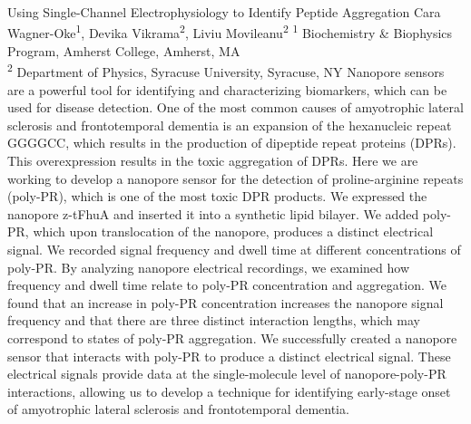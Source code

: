 \makeabstract
    {
    Using Single-Channel Electrophysiology to Identify Peptide Aggregation
    }
    {
    Cara Wagner-Oke\textsuperscript{1}, Devika Vikrama\textsuperscript{2}, Liviu Movileanu\textsuperscript{2}
    }
    {
    \textsuperscript{1} Biochemistry \& Biophysics Program, Amherst College, Amherst, MA\\
\textsuperscript{2} Department of Physics, Syracuse University, Syracuse, NY
    }
    {
    Nanopore sensors are a powerful tool for identifying and characterizing biomarkers, which can be used for disease detection. One of the most common causes of amyotrophic lateral sclerosis and frontotemporal dementia is an expansion of the hexanucleic repeat GGGGCC, which results in the production of dipeptide repeat proteins (DPRs). This overexpression results in the toxic aggregation of DPRs. Here we are working to develop a nanopore sensor for the detection of proline-arginine repeats (poly-PR), which is one of the most toxic DPR products.
    }
    {
    We expressed the nanopore z-tFhuA and inserted it into a synthetic lipid bilayer. We added poly-PR, which upon translocation of the nanopore, produces a distinct electrical signal. We recorded signal frequency and dwell time at different concentrations of poly-PR. By analyzing nanopore electrical recordings, we examined how frequency and dwell time relate to poly-PR concentration and aggregation. 
    }
    {
    We found that an increase in poly-PR concentration increases the nanopore signal frequency and that there are three distinct interaction lengths, which may correspond to states of poly-PR aggregation.
    }
    {
    We successfully created a nanopore sensor that interacts with poly-PR to produce a distinct electrical signal. These electrical signals provide data at the single-molecule level of nanopore-poly-PR interactions, allowing us to develop a technique for identifying early-stage onset of amyotrophic lateral sclerosis and frontotemporal dementia.
    }

    \newpage
    